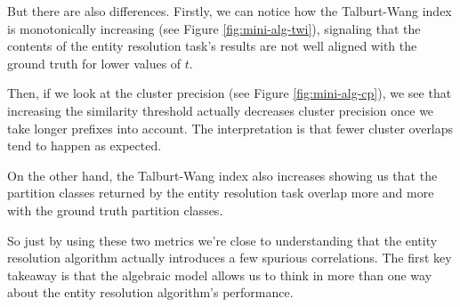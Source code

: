 \documentclass[lettersize,journal]{IEEEtran}
\begin{document}
    But there are also differences.
    Firstly, we can notice how the Talburt-Wang index is monotonically
    increasing (see Figure \ref{fig:mini-alg-twi}), signaling that the contents of the entity resolution task's
    results are not well aligned with the ground truth for lower values of $t$.
    
    Then, if we look at the cluster precision (see Figure \ref{fig:mini-alg-cp}), we see that increasing the
    similarity threshold actually decreases cluster precision once we take longer prefixes into account.
    The interpretation is that fewer cluster overlaps tend to happen as expected. 

    On the other hand, the Talburt-Wang index also increases showing us that the
    partition classes returned by the entity resolution task overlap more and
    more with the ground truth partition classes.
    
    So just by using these two metrics we're close to understanding that the
    entity resolution algorithm actually introduces a few spurious correlations.
    The first key takeaway is that the algebraic model allows us to think in
    more than one way about the entity resolution algorithm's performance.
\end{document}
